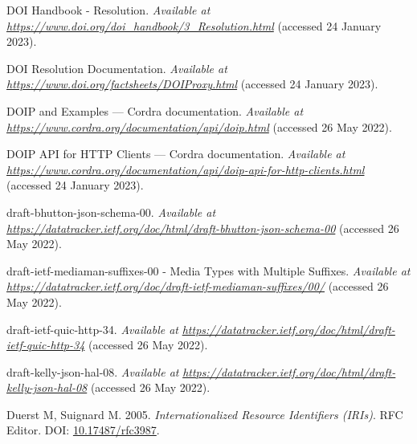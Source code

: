 \begin{CSLReferences}{1}{0}
\leavevmode{}%
DOI Handbook - Resolution. \emph{Available at} \href{https://www.doi.org/doi_handbook/3_Resolution.html}{\emph{https://www.doi.org/doi\_handbook/3\_Resolution.html}} (accessed 24 January 2023).

\leavevmode{}%
DOI Resolution Documentation. \emph{Available at} \href{https://www.doi.org/factsheets/DOIProxy.html}{\emph{https://www.doi.org/factsheets/DOIProxy.html}} (accessed 24 January 2023).

\leavevmode{}%
DOIP and Examples --- Cordra documentation. \emph{Available at} \href{https://www.cordra.org/documentation/api/doip.html}{\emph{https://www.cordra.org/documentation/api/doip.html}} (accessed 26 May 2022).

\leavevmode{}%
DOIP API for HTTP Clients --- Cordra documentation. \emph{Available at} \href{https://www.cordra.org/documentation/api/doip-api-for-http-clients.html}{\emph{https://www.cordra.org/documentation/api/doip-api-for-http-clients.html}} (accessed 24 January 2023).

\leavevmode{}%
draft-bhutton-json-schema-00. \emph{Available at} \href{https://datatracker.ietf.org/doc/html/draft-bhutton-json-schema-00}{\emph{https://datatracker.ietf.org/doc/html/draft-bhutton-json-schema-00}} (accessed 26 May 2022).

\leavevmode{}%
draft-ietf-mediaman-suffixes-00 - Media Types with Multiple Suffixes. \emph{Available at} \href{https://datatracker.ietf.org/doc/draft-ietf-mediaman-suffixes/00/}{\emph{https://datatracker.ietf.org/doc/draft-ietf-mediaman-suffixes/00/}} (accessed 26 May 2022).

\leavevmode{}%
draft-ietf-quic-http-34. \emph{Available at} \href{https://datatracker.ietf.org/doc/html/draft-ietf-quic-http-34}{\emph{https://datatracker.ietf.org/doc/html/draft-ietf-quic-http-34}} (accessed 26 May 2022).

\leavevmode{}%
draft-kelly-json-hal-08. \emph{Available at} \href{https://datatracker.ietf.org/doc/html/draft-kelly-json-hal-08}{\emph{https://datatracker.ietf.org/doc/html/draft-kelly-json-hal-08}} (accessed 26 May 2022).

\leavevmode{}%
Duerst M, Suignard M. 2005. \emph{Internationalized Resource Identifiers (IRIs)}. RFC Editor. DOI: \href{https://doi.org/10.17487/rfc3987}{10.17487/rfc3987}.


\end{CSLReferences}
